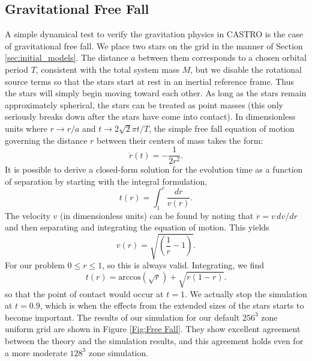 \documentclass[iop]{emulateapj}
\begin{document}
\subsection{Gravitational Free Fall}\label{sec:Gravitational Free Fall}

A simple dynamical test to verify the gravitation physics in CASTRO is
the case of gravitational free fall. We place two stars on the grid 
in the manner of Section \ref{sec:initial_models}. The distance $a$ between 
them corresponds to a chosen orbital period $T$, consistent with the total
system mass $M$, but we disable the rotational source terms so that 
the stars start at rest in an inertial reference frame. 
Thus the stars will simply begin moving toward each other.
As long as the stars remain approximately spherical, the stars can be 
treated as point masses (this only seriously breaks down after the stars
have come into contact). In dimensionless units where $r \to r / a$ and 
$t \to 2\sqrt{2}\pi t / T$, the simple free fall equation of motion governing the
distance $r$ between their centers of mass takes the form:
\begin{equation}
  \ddot{r}(t) = - \frac{1}{2r^2}.
\end{equation}
It is possible to derive a closed-form solution for the evolution time
as a function of separation by starting with the integral formulation,
\begin{equation}
  t(r) = \int_{1}^{r} \frac{dr}{v(r)}.
\end{equation}
The velocity $v$ (in dimensionless units) can be found by noting that 
$\ddot{r} = v\, dv / dr$ and then separating and integrating the equation 
of motion. This yields 
\begin{equation}
  v(r) = \sqrt{\left(\frac{1}{r} - 1\right)}.
\end{equation}
For our problem $0 \leq r \leq 1$, so this is always valid. Integrating, we find
\begin{equation}
  t(r) = \text{arccos}\left(\sqrt{r}\right) + \sqrt{r \left(1 - r\right)}. \label{analyticalFreeFall}
\end{equation}
so that the point of contact would occur at $t = 1$. We actually stop the simulation
at $t = 0.9$, which is when the effects from the extended sizes of the stars
starts to become important. The results of our simulation for our default $256^3$ zone 
uniform grid are shown in Figure \ref{Fig:Free Fall}. They show excellent agreement
between the theory and the simulation results, and this agreement holds even for 
a more moderate $128^3$ zone simulation.
\end{document}
